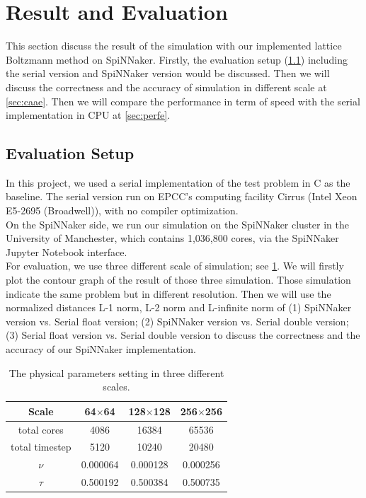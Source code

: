 \section{Result and Evaluation} \label{sec:eval}
This section discuss the result of the simulation with our implemented lattice Boltzmann method on SpiNNaker. Firstly, the evaluation setup (\ref{sec:es}) including the serial version and SpiNNaker version would be discussed. Then we will discuss the correctness and the accuracy of simulation in different scale at \ref{sec:caae}. Then we will compare the performance in term of speed with the serial implementation in CPU at \ref{sec:perfe}.
\subsection{Evaluation Setup} \label{sec:es}
In this project, we used a serial implementation of the test problem in C as the baseline. The serial version run on EPCC's computing facility Cirrus (Intel Xeon E5-2695 (Broadwell)), with no compiler optimization.\\

On the SpiNNaker side, we run our simulation on the SpiNNaker cluster in the University of Manchester, which contains 1,036,800 cores, via the SpiNNaker Jupyter Notebook interface. \\

For evaluation, we use three different scale of simulation; see \ref{table:setting}. We will firstly plot the contour graph of the result of those three simulation. Those simulation indicate the same problem but in different resolution. Then we will use the normalized distances L-1 norm, L-2 norm and L-infinite norm  of (1) SpiNNaker version vs. Serial float version; (2) SpiNNaker version vs. Serial double version; (3) Serial float version vs. Serial double version to discuss the correctness and the accuracy of our SpiNNaker implementation.\\

\begin{table}[tb]
\centering
\begin{tabular}{|c|c|c|c|}
\hline
Scale          & 64$\times$64 & 128$\times$128 & 256$\times$256 \\ \hline
total cores    & 4086         & 16384          & 65536          \\ \hline
total timestep  & 5120         & 10240          & 20480          \\ \hline
$\nu$           & 0.000064     & 0.000128       & 0.000256       \\ \hline
$\tau$           & 0.500192     & 0.500384       & 0.500735       \\ \hline
\end{tabular}
\caption{The physical parameters setting in three different scales.}
\label{table:setting}
\end{table}


